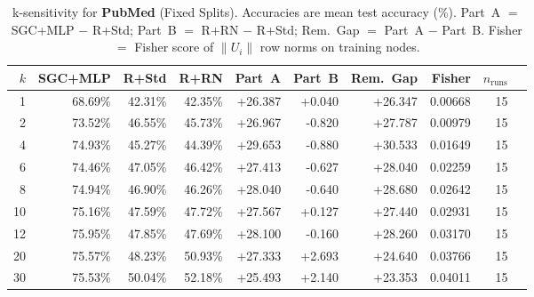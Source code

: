 \begin{table}[t]
\centering\small\setlength{\tabcolsep}{5pt}
\caption{k-sensitivity for \textbf{PubMed} (Fixed Splits). Accuracies are mean test accuracy (\%). Part~A $=$ SGC+MLP $-$ R+Std; Part~B $=$ R+RN $-$ R+Std; Rem.~Gap $=$ Part~A $-$ Part~B. Fisher $=$ Fisher score of $\|U_i\|$ row norms on training nodes.}
\label{tab:exp8_per_dataset_pubmed_fixed}
\begin{tabular}{rrrrrrrrrr}
\toprule
$k$ & SGC+MLP & R+Std & R+RN & Part~A & Part~B & Rem.~Gap & Fisher & $n_{\mathrm{runs}}$ \\
\midrule
1 & 68.69\% & 42.31\% & 42.35\% & +26.387 & +0.040 & +26.347 & 0.00668 & 15 \\
2 & 73.52\% & 46.55\% & 45.73\% & +26.967 & -0.820 & +27.787 & 0.00979 & 15 \\
4 & 74.93\% & 45.27\% & 44.39\% & +29.653 & -0.880 & +30.533 & 0.01649 & 15 \\
6 & 74.46\% & 47.05\% & 46.42\% & +27.413 & -0.627 & +28.040 & 0.02259 & 15 \\
8 & 74.94\% & 46.90\% & 46.26\% & +28.040 & -0.640 & +28.680 & 0.02642 & 15 \\
10 & 75.16\% & 47.59\% & 47.72\% & +27.567 & +0.127 & +27.440 & 0.02931 & 15 \\
12 & 75.95\% & 47.85\% & 47.69\% & +28.100 & -0.160 & +28.260 & 0.03170 & 15 \\
20 & 75.57\% & 48.23\% & 50.93\% & +27.333 & +2.693 & +24.640 & 0.03766 & 15 \\
30 & 75.53\% & 50.04\% & 52.18\% & +25.493 & +2.140 & +23.353 & 0.04011 & 15 \\
\bottomrule
\end{tabular}
\end{table}

